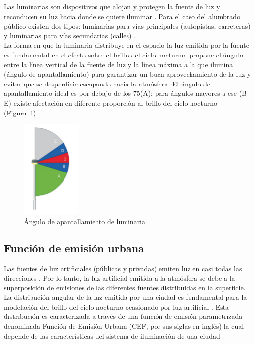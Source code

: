 Las luminarias son dispositivos que alojan y protegen la fuente de luz y reconducen su luz hacia donde se quiere iluminar \citep{LibroCL}. Para el caso del alumbrado público existen dos tipos: luminarias para vías principales (autopistas, carreteras) y luminarias para vías secundarias (calles) \citep{INFO2019}.\\

La forma en que la luminaria distribuye en el espacio la luz emitida por la fuente es fundamental en el efecto sobre el brillo del cielo nocturno. \cite{Marin2009} propone el ángulo entre la línea vertical de la fuente de luz y la línea máxima a la que ilumina (ángulo de apantallamiento) para garantizar un buen aprovechamiento de la luz y evitar que se desperdicie escapando hacia la atmósfera. El ángulo de apantallamiento ideal es por debajo de los 75\grad (A); para ángulos mayores a ese (B - E) existe afectación en diferente proporción al brillo del cielo nocturno (Figura~\ref{anguloapantallamiento}).


\begin{figure}[htb]
  \centering
    \includegraphics[width=30mm, scale=0.3]{anguloapantallamiento}
  \caption{Ángulo de apantallamiento de luminaria \citep{Marin2009}}
  \label{anguloapantallamiento}
\end{figure}


\subsection{Función de emisión urbana}
\label{subsec:funciondemisionurbana}

Las fuentes de luz artificiales (públicas y privadas) emiten luz en casi todas las direcciones \citep{Kocifaj2014,Kocifaj2016}. Por lo tanto, la luz artificial emitida a la atmósfera se debe a la superposición de emisiones de las diferentes fuentes distribuidas en la superficie.\\

La distribución angular de la luz emitida por una ciudad es fundamental para la modelación del brillo del cielo nocturno ocasionado por luz artificial \citep{Kocifaj2014}. Esta distribución es caracterizada a través de una función de emisión parametrizada denominada Función de Emisión Urbana (CEF, por sus siglas en inglés) la cual depende de las características del sistema de iluminación de una ciudad \citep{Kocifaj2014}.\\

